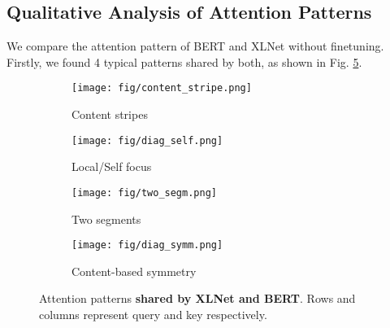 \documentclass{article}
\begin{document}
\subsection{Qualitative Analysis of Attention Patterns} \label{sec:qual}

We compare the attention pattern of BERT and XLNet without finetuning. Firstly, we found 4 typical patterns shared by both, as shown in Fig. \ref{fig:shared_attn}.
\begin{figure}[!h]
  \vspace{-1em}
  \centering
  \begin{subfigure}[b]{0.22\textwidth}
    \centering
    \texttt{[image: fig/content\_stripe.png]}
    \caption{\footnotesize Content stripes}
    \label{fig:content_stripe}
    \vspace{-0.3em}
  \end{subfigure}
  \hfill
  \begin{subfigure}[b]{0.235\textwidth}
    \centering
    \texttt{[image: fig/diag\_self.png]}
    \caption{\footnotesize Local/Self focus}
    \label{fig:diag_self}
    \vspace{-0.3em}
  \end{subfigure}
  \hfill
  \begin{subfigure}[b]{0.22\textwidth}
    \centering
    \texttt{[image: fig/two\_segm.png]}
    \caption{\footnotesize Two segments}
    \label{fig:two_segm}
    \vspace{-0.3em}
  \end{subfigure}
  \hfill
  \begin{subfigure}[b]{0.23\textwidth}
    \centering
    \texttt{[image: fig/diag\_symm.png]}
    \caption{\footnotesize Content-based symmetry}
    \label{fig:diag_symm}
    \vspace{-0.3em}
  \end{subfigure}
  \caption{\footnotesize Attention patterns \textbf{shared by XLNet and BERT}. Rows and columns represent query and key respectively.}
  \label{fig:shared_attn}
  \vspace{-1.5em}
\end{figure}
\end{document}
